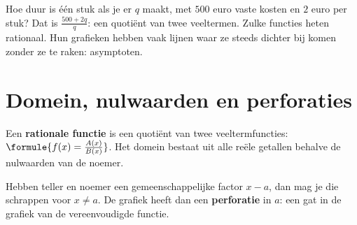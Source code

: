 %



Hoe duur is één stuk als je er $q$ maakt, met $500$ euro vaste kosten en $2$ euro per stuk? Dat is $\frac{500 + 2q}{q}$: een quotiënt van twee veeltermen. Zulke functies heten rationaal. Hun grafieken hebben vaak lijnen waar ze steeds dichter bij komen zonder ze te raken: asymptoten.

\begin{oefeningen}[Start]

\end{oefeningen}

\section{Domein, nulwaarden en perforaties}

\begin{theorie}
Een \textbf{\textcolor{accent}{rationale functie}} is een quotiënt van twee veeltermfuncties: $\formule{f(x) = \frac{A(x)}{B(x)}}$. Het domein bestaat uit alle reële getallen behalve de nulwaarden van de noemer.

Hebben teller en noemer een gemeenschappelijke factor $x - a$, dan mag je die schrappen voor $x \neq a$. De grafiek heeft dan een \textbf{\textcolor{accent}{perforatie}} in $a$: een gat in de grafiek van de vereenvoudigde functie.
\end{theorie}

